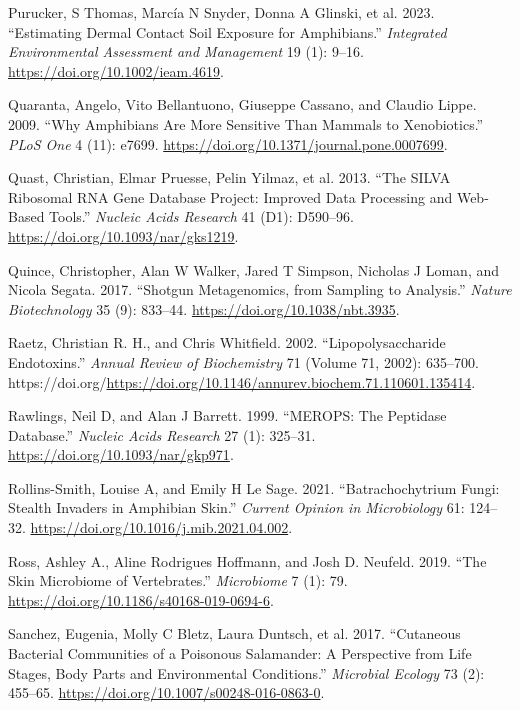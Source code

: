 \documentclass[
  12pt,
]{article}
\newlength{\cslhangindent}
\newenvironment{CSLReferences}[2] %
 {\begin{list}{}{%
  \setlength{\itemindent}{0pt}
  \setlength{\leftmargin}{0pt}
  \setlength{\parsep}{0pt}
  \ifodd #1
   \setlength{\leftmargin}{\cslhangindent}
   \setlength{\itemindent}{-1\cslhangindent}
  \fi
  \setlength{\itemsep}{#2\baselineskip}}}
 {\end{list}}
\begin{document}
\begin{CSLReferences}{1}{1}
Purucker, S Thomas, Marcía N Snyder, Donna A Glinski, et al. 2023.
{``Estimating Dermal Contact Soil Exposure for Amphibians.''}
\emph{Integrated Environmental Assessment and Management} 19 (1): 9--16.
\url{https://doi.org/10.1002/ieam.4619}.

Quaranta, Angelo, Vito Bellantuono, Giuseppe Cassano, and Claudio Lippe.
2009. {``Why Amphibians Are More Sensitive Than Mammals to
Xenobiotics.''} \emph{PLoS One} 4 (11): e7699.
\url{https://doi.org/10.1371/journal.pone.0007699}.

Quast, Christian, Elmar Pruesse, Pelin Yilmaz, et al. 2013. {``The
{SILVA} Ribosomal {RNA} Gene Database Project: Improved Data Processing
and Web-Based Tools.''} \emph{Nucleic Acids Research} 41 (D1): D590--96.
\url{https://doi.org/10.1093/nar/gks1219}.

Quince, Christopher, Alan W Walker, Jared T Simpson, Nicholas J Loman,
and Nicola Segata. 2017. {``Shotgun Metagenomics, from Sampling to
Analysis.''} \emph{Nature Biotechnology} 35 (9): 833--44.
\url{https://doi.org/10.1038/nbt.3935}.

Raetz, Christian R. H., and Chris Whitfield. 2002. {``Lipopolysaccharide
{Endotoxins}.''} \emph{Annual Review of Biochemistry} 71 (Volume 71,
2002): 635--700.
https://doi.org/\url{https://doi.org/10.1146/annurev.biochem.71.110601.135414}.

Rawlings, Neil D, and Alan J Barrett. 1999. {``{MEROPS}: The Peptidase
Database.''} \emph{Nucleic Acids Research} 27 (1): 325--31.
\url{https://doi.org/10.1093/nar/gkp971}.

Rollins-Smith, Louise A, and Emily H Le Sage. 2021. {``Batrachochytrium
Fungi: Stealth Invaders in Amphibian Skin.''} \emph{Current Opinion in
Microbiology} 61: 124--32.
\url{https://doi.org/10.1016/j.mib.2021.04.002}.

Ross, Ashley A., Aline Rodrigues Hoffmann, and Josh D. Neufeld. 2019.
{``The Skin Microbiome of Vertebrates.''} \emph{Microbiome} 7 (1): 79.
\url{https://doi.org/10.1186/s40168-019-0694-6}.

Sanchez, Eugenia, Molly C Bletz, Laura Duntsch, et al. 2017.
{``Cutaneous Bacterial Communities of a Poisonous Salamander: A
Perspective from Life Stages, Body Parts and Environmental
Conditions.''} \emph{Microbial Ecology} 73 (2): 455--65.
\url{https://doi.org/10.1007/s00248-016-0863-0}.


\end{CSLReferences}
\end{document}
